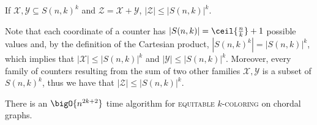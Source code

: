 \begin{lemma}
    \label{lem:counter_bound}
    If $\mathcal{X}, \mathcal{Y} \subseteq S(n,k)^k$ and $\mathcal{Z} = \mathcal{X} + \mathcal{Y}$, $|\mathcal{Z}| \leq |S(n,k)|^k $.
\end{lemma}

\begin{tproof}
Note that each coordinate of a counter has $|S(n,k)| = \ceil{\frac{n}{k}} + 1$ possible values and, by the definition of the Cartesian product, $|S(n,k)^k| = |S(n,k)|^k$, which implies that $|\mathcal{X}| \leq |S(n,k)|^k$ and $|\mathcal{Y}| \leq |S(n,k)|^k$.
Moreover, every family of counters resulting from the sum of two other families $\mathcal{X}, \mathcal{Y}$ is a subset of $S(n,k)^k$, thus we have that $|\mathcal{Z}| \leq |S(n,k)|^k$.
\end{tproof}


\begin{theorem}
    \label{thm:chordal_exp}
    There is an $\bigO{n^{2k+2}}$ time algorithm for \textsc{equitable $k$-coloring} on chordal graphs.
\end{theorem}

